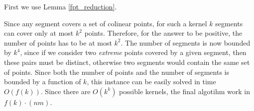 First we use Lemma \ref{fpt_reduction}.

Since any segment covers a set of colinear points,
for such a kernel $k$ segments can cover only at most $k^2$ points.
Therefore, for the answer to be positive,
the number of points has to be at most $k^2$.
The number of segments is now bounded by $k^4$,
since if we consider two \textit{extreme} points
covered by a given segment,
then these pairs must be distinct,
otherwise two segments would contain the same set of points.
Since both the number of points and the number of segments
is bounded by a function of $k$,
this instance can be easily solved in time $O(f(k))$.
Since there are $O(k^k)$ possible kernels, the final algotihm
work in $f(k) \cdot (nm)$.
